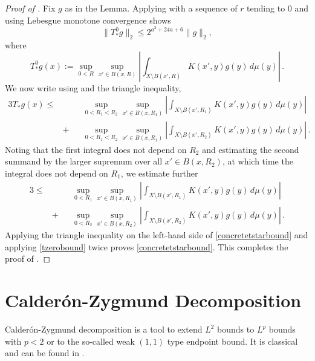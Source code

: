 \begin{proof}[Proof of ]
Fix $g$ as in the Lemma.
Applying  with a
sequence of $r$ tending to $0$ and using Lebesgue monotone convergence shows
\begin{equation}\label{tzerobound}
    \|T_*^{0}g\|_2\le 2^{a^3+24a+6}\|g\|_2,
\end{equation}
where
\begin{equation}\label{eq-simpler--nontangential}
    T_*^{0} g(x):=\sup_{0<R}\sup_{x'\in B(x,R)} \left|\int_{X\setminus B(x',R)}
K(x',y) g(y)\, d\mu(y)\right|\, .
\end{equation}
We now write using  and the triangle inequality,
\begin{alignat*}{3}\label{concretetstartriangle}
    T_* g(x)\le&&&\sup_{0<R_1<R_2}\sup_{x'\in B(x,R_1)} \left|\int_{X\setminus B(x',R_1)}K(x',y) g(y)\, d\mu(y)\right| \\
&+&&\sup_{0<R_1<R_2}\sup_{x'\in B(x,R_1)} \left|\int_{X\setminus B(x',R_2)} K(x',y) g(y)\, d\mu(y)\right|\, .
\end{alignat*}
Noting that the first integral does not depend on $R_2$ and
estimating the second summand by the larger supremum over all
$x'\in B(x,R_2)$, at which time the integral does not depend on $R_1$, we estimate further
\begin{alignat*}{3}
    \le&&&\sup_{0<R_1}\sup_{x'\in B(x,R_1)} \left|\int_{X\setminus B(x',R_1)}K(x',y) g(y)\, d\mu(y)\right| \\
    &+  &&\sup_{0<R_2}\sup_{x'\in B(x,R_2)} \left|\int_{X\setminus B(x',R_2)} K(x',y) g(y)\, d\mu(y)\right|\, .
\end{alignat*}
    Applying the triangle inequality on the left-hand side
    of \eqref{concretetstarbound} and applying
     \eqref{tzerobound} twice
    proves \eqref{concretetstarbound}.
    This completes the proof of .
\end{proof}





\section{Calder\'on-Zygmund Decomposition}
\label{subsec-CZD}
Calder\'on-Zygmund decomposition is a tool to extend $L^2$ bounds to $L^p$ bounds with $p<2$ or to the so-called weak $(1, 1)$ type endpoint bound.
It is classical and can be found in \cite{stein-book}.

